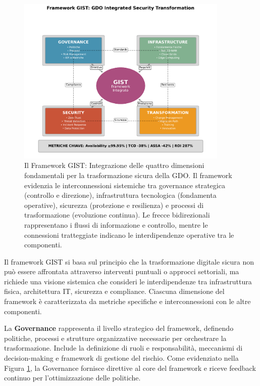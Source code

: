 \begin{figure}[htbp]
\centering
\includegraphics[width=0.9\textwidth]{thesis_figures/cap1/fig_1_1_gist_framework.pdf}
\caption{Il Framework GIST: Integrazione delle quattro dimensioni fondamentali per la trasformazione sicura della GDO. Il framework evidenzia le interconnessioni sistemiche tra governance strategica (controllo e direzione), infrastruttura tecnologica (fondamenta operative), sicurezza (protezione e resilienza) e processi di trasformazione (evoluzione continua). Le frecce bidirezionali rappresentano i flussi di informazione e controllo, mentre le connessioni tratteggiate indicano le interdipendenze operative tra le componenti.}
\label{fig:gist_framework}
\end{figure}

Il framework GIST si basa sul principio che la trasformazione digitale sicura non può essere affrontata attraverso interventi puntuali o approcci settoriali, ma richiede una visione sistemica che consideri le interdipendenze tra infrastruttura fisica, architettura IT, sicurezza e compliance. Ciascuna dimensione del framework è caratterizzata da metriche specifiche e interconnessioni con le altre componenti.

La \textbf{Governance} rappresenta il livello strategico del framework, definendo politiche, processi e strutture organizzative necessarie per orchestrare la trasformazione. Include la definizione di ruoli e responsabilità, meccanismi di decision-making e framework di gestione del rischio. Come evidenziato nella Figura \ref{fig:gist_framework}, la Governance fornisce direttive al core del framework e riceve feedback continuo per l'ottimizzazione delle politiche.

